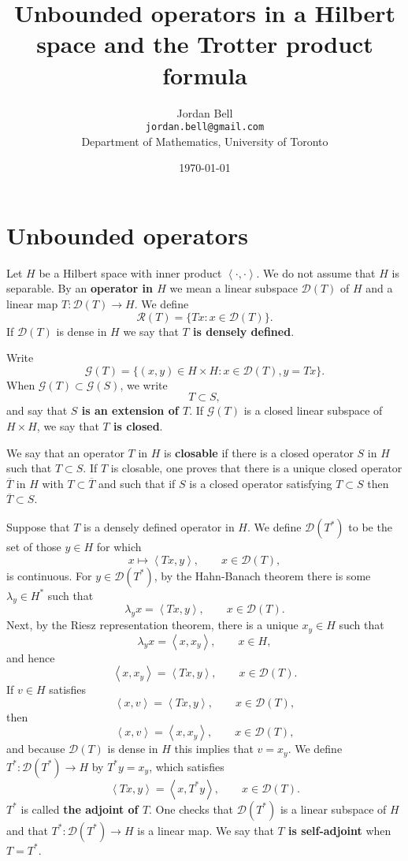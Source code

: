 \documentclass{article}
\newcommand{\inner}[2]{\left\langle #1, #2 \right\rangle}
\theoremstyle{definition}
\begin{document}
\title{Unbounded operators in a Hilbert space and the Trotter product formula}
\author{Jordan Bell\\ \texttt{jordan.bell@gmail.com}\\Department of Mathematics, University of Toronto}
\date{\today}

\maketitle

\section{Unbounded operators}
Let $H$ be a Hilbert space with inner product $\inner{\cdot}{\cdot}$. We do not assume that $H$ is separable.
By an \textbf{operator in $H$} we mean 
a linear subspace
$\mathscr{D}(T)$ of $H$ and a linear map
$T:\mathscr{D}(T) \to H$.
We define
\[
\mathscr{R}(T) = \{Tx: x \in \mathscr{D}(T)\}.
\]
If $\mathscr{D}(T)$ is dense in $H$ we say that \textbf{$T$ is densely defined}.

Write
\[
\mathscr{G}(T) = \{(x,y) \in H \times H: x \in \mathscr{D}(T), y = Tx\}.
\]
When $\mathscr{G}(T) \subset \mathscr{G}(S)$, we write
\[
T \subset S,
\]
and say that \textbf{$S$ is an extension of $T$}.
If $\mathscr{G}(T)$ is a closed linear subspace of $H \times H$, we say that \textbf{$T$ is closed}.

We say that an operator $T$ in $H$ is \textbf{closable} if there is a closed operator $S$ in $H$ such that
$T \subset S$. If $T$ is closable, one proves that there is a unique closed operator $\overline{T}$ in $H$ with
$T \subset \overline{T}$ and such that if $S$ is a closed operator satisfying $T \subset S$ then
$\overline{T} \subset S$. 

Suppose that $T$ is a densely defined operator in $H$. We define $\mathscr{D}(T^*)$ to be
the set of those $y \in H$ for which 
\[
x \mapsto \inner{Tx}{y}, \qquad x \in \mathscr{D}(T),
\]
is continuous. For $y \in \mathscr{D}(T^*)$, by the Hahn-Banach theorem there is some $\lambda_y
\in H^*$ such that
\[
\lambda_y x = \inner{Tx}{y}, \qquad x \in \mathscr{D}(T).
\]
Next, by the Riesz representation theorem, there is a unique 
$x_y \in H$ such that
\[
\lambda_y x = \inner{x}{x_y}, \qquad x \in H,
\]
and hence
\[
\inner{x}{x_y} = \inner{Tx}{y}, \qquad x \in \mathscr{D}(T).
\]
If $v \in H$ satisfies
\[
\inner{x}{v} = \inner{Tx}{y}, \qquad x \in \mathscr{D}(T),
\]
then 
\[
\inner{x}{v} = \inner{x}{x_y}, \qquad x \in \mathscr{D}(T),
\]
and because $\mathscr{D}(T)$ is dense in $H$ this implies that $v=x_y$.
We define
$T^*:\mathscr{D}(T^*) \to H$ by $T^*y = x_y$, which satisfies
\[
\inner{Tx}{y} = \inner{x}{T^*y}, \qquad x \in \mathscr{D}(T).
\]
$T^*$ is called \textbf{the adjoint of $T$}.
One checks that $\mathscr{D}(T^*)$ is a linear subspace of $H$ and that
$T^*:\mathscr{D}(T^*) \to H$ is a linear map.
We say that \textbf{$T$ is self-adjoint} when $T=T^*$.
\end{document}
